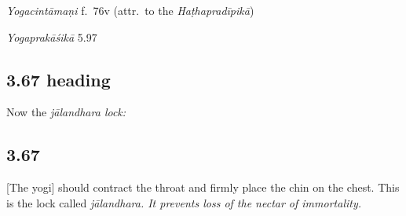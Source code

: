 \begin{ekdosis}

\begin{testimonia}[hp03_066]
\emph{Yogacintāmaṇi} f.~76v (attr.~to the \emph{Haṭhapradīpikā})
\begin{versinnote}
\end{versinnote}

\emph{Yogaprakāśikā} 5.97
\begin{versinnote}
\end{versinnote}
\end{testimonia}



\subsection*{3.67 heading}
\begin{translation}[hp03_067a]
Now the \sl{jālandhara} lock:
\end{translation}


\subsection*{3.67}
\begin{translation}[hp03_067]
{}[The yogi] should contract the throat and firmly place the chin on the chest. This is the lock called \sl{jālandhara}. It prevents loss of the nectar of immortality.
\end{translation}


\end{ekdosis}
